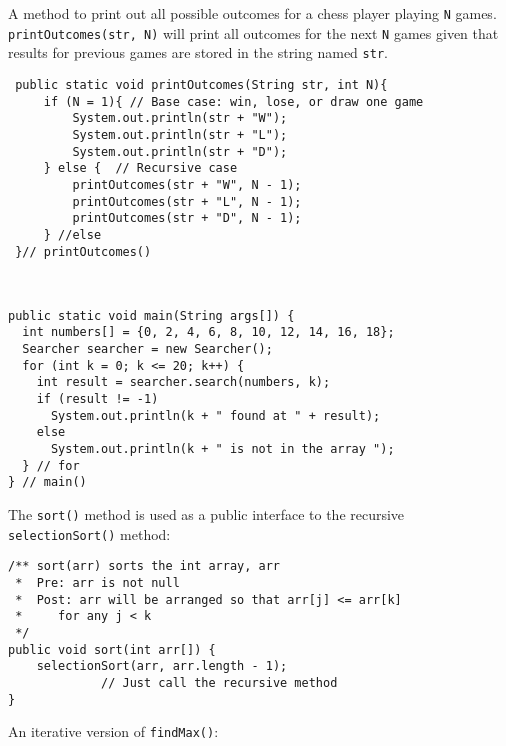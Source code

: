 \begin{ANS}
\item A method to print out all possible outcomes for a chess player
playing {\tt N} games. {\tt printOutcomes(str, N)} will print all
outcomes for the next {\tt N} games given that results for previous
games are stored in the string named {\tt str}. 
\begin{jjjlisting}
\begin{lstlisting}
 public static void printOutcomes(String str, int N){
     if (N = 1){ // Base case: win, lose, or draw one game
         System.out.println(str + "W");
         System.out.println(str + "L");
         System.out.println(str + "D");
     } else {  // Recursive case
         printOutcomes(str + "W", N - 1);
         printOutcomes(str + "L", N - 1);
         printOutcomes(str + "D", N - 1);
     } //else
 }// printOutcomes()
\end{lstlisting}
\end{jjjlisting}

\item  \mbox{ }
\begin{jjjlisting}
\begin{lstlisting}
public static void main(String args[]) {
  int numbers[] = {0, 2, 4, 6, 8, 10, 12, 14, 16, 18};
  Searcher searcher = new Searcher();
  for (int k = 0; k <= 20; k++) {
    int result = searcher.search(numbers, k);
    if (result != -1)
      System.out.println(k + " found at " + result);
    else
      System.out.println(k + " is not in the array ");
  } // for
} // main()
\end{lstlisting}
\end{jjjlisting}

\item  The {\tt sort()} method is used as a public interface to the
recursive {\tt selectionSort()} method:

\begin{jjjlisting}
\begin{lstlisting}
/** sort(arr) sorts the int array, arr
 *  Pre: arr is not null
 *  Post: arr will be arranged so that arr[j] <= arr[k] 
 *     for any j < k
 */
public void sort(int arr[]) {
    selectionSort(arr, arr.length - 1);  
             // Just call the recursive method
}
\end{lstlisting}
\end{jjjlisting}

\item  An iterative version of {\tt findMax()}:


\end{ANS}
